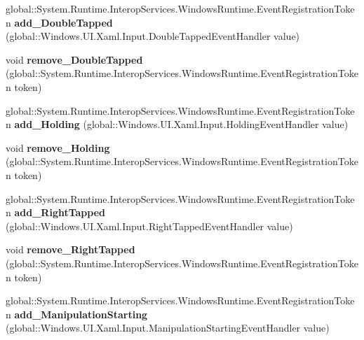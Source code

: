 \begin{DoxyCompactItemize}
global\+::\+System.\+Runtime.\+Interop\+Services.\+Windows\+Runtime.\+Event\+Registration\+Token {\bfseries add\+\_\+\+Double\+Tapped} (global\+::\+Windows.\+U\+I.\+Xaml.\+Input.\+Double\+Tapped\+Event\+Handler value)
\item 
\mbox{\label{interface_windows_1_1_u_i_1_1_xaml_1_1_i_u_i_element_ab7e8271e8ceb0cc5ca0b7bb3423f726f}} 
void {\bfseries remove\+\_\+\+Double\+Tapped} (global\+::\+System.\+Runtime.\+Interop\+Services.\+Windows\+Runtime.\+Event\+Registration\+Token token)
\item 
\mbox{\label{interface_windows_1_1_u_i_1_1_xaml_1_1_i_u_i_element_aa8c0e6b4397f0226baab3ec71083abba}} 
global\+::\+System.\+Runtime.\+Interop\+Services.\+Windows\+Runtime.\+Event\+Registration\+Token {\bfseries add\+\_\+\+Holding} (global\+::\+Windows.\+U\+I.\+Xaml.\+Input.\+Holding\+Event\+Handler value)
\item 
\mbox{\label{interface_windows_1_1_u_i_1_1_xaml_1_1_i_u_i_element_a731b5111082558a2945d799084cfbd79}} 
void {\bfseries remove\+\_\+\+Holding} (global\+::\+System.\+Runtime.\+Interop\+Services.\+Windows\+Runtime.\+Event\+Registration\+Token token)
\item 
\mbox{\label{interface_windows_1_1_u_i_1_1_xaml_1_1_i_u_i_element_ae3a5c2e71c2ae0d8a2d7ce2beb34673e}} 
global\+::\+System.\+Runtime.\+Interop\+Services.\+Windows\+Runtime.\+Event\+Registration\+Token {\bfseries add\+\_\+\+Right\+Tapped} (global\+::\+Windows.\+U\+I.\+Xaml.\+Input.\+Right\+Tapped\+Event\+Handler value)
\item 
\mbox{\label{interface_windows_1_1_u_i_1_1_xaml_1_1_i_u_i_element_a3582ef21b0d8aa47e220b343772155be}} 
void {\bfseries remove\+\_\+\+Right\+Tapped} (global\+::\+System.\+Runtime.\+Interop\+Services.\+Windows\+Runtime.\+Event\+Registration\+Token token)
\item 
\mbox{\label{interface_windows_1_1_u_i_1_1_xaml_1_1_i_u_i_element_a893f1fc019c5b01a9edcf81dbae7fb71}} 
global\+::\+System.\+Runtime.\+Interop\+Services.\+Windows\+Runtime.\+Event\+Registration\+Token {\bfseries add\+\_\+\+Manipulation\+Starting} (global\+::\+Windows.\+U\+I.\+Xaml.\+Input.\+Manipulation\+Starting\+Event\+Handler value)

\end{DoxyCompactItemize}
